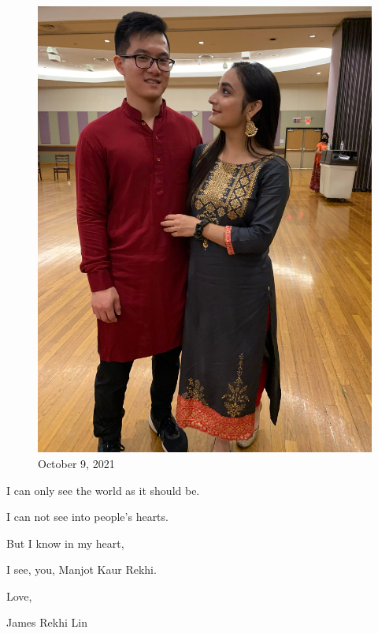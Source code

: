 \documentclass[
]{book}
\begin{document}
\begin{figure}
\centering
\includegraphics[width=5.20833in,height=\textheight]{mimages/13.3 10-9-2021.jpg}
\caption{October 9, 2021}
\end{figure}

I can only see the world as it should be.

I can not see into people's hearts.

But I know in my heart,

I see, you, Manjot Kaur Rekhi.

Love,

James Rekhi Lin
\end{document}
